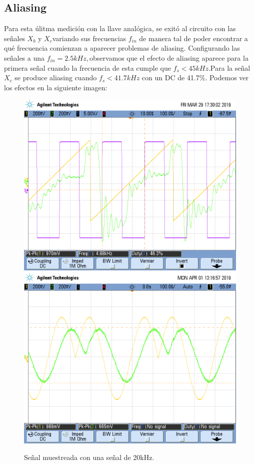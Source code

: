 \documentclass[../../ASSD_TP1_G7.tex]{subfiles}
\begin{document}
\subsection{Aliasing}

Para esta úlitma medición con la llave analógica, se exitó al circuito
con las señales $X_{b}$ y $X_{c}$variando sus frecuencias $f_{in}$
de manera tal de poder encontrar a qué frecuencia comienzan a aparecer
problemas de aliasing. Configurando las señales a una $f_{in}=2.5kHz,$observamos
que el efecto de aliasing aparece para la primera señal cuando la
frecuencia de esta cumple que $f_{s}<45kHz$.Para la señal $X_{c}$
se produce aliasing cuando $f_{s}<41.7kHz$ con un DC de 41.7\%. Podemos
ver los efectos en la siguiente imagen:

\begin{figure}[H]
\begin{centering}
\includegraphics[scale=0.25]{Imagenes/yh_pt6d_cuad2}\includegraphics[scale=0.25]{Imagenes/ej_6_d}
\par\end{centering}
\caption{Señal muestreada con una señal de 20kHz.}
\end{figure}
\end{document}
